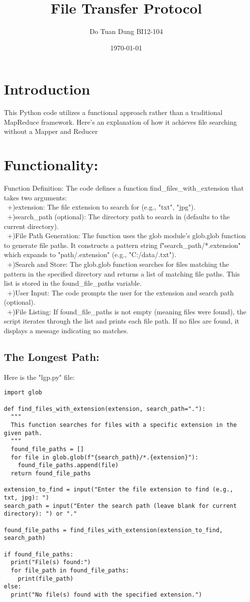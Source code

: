 \documentclass{article}
\title{File Transfer Protocol}
\author{Do Tuan Dung BI12-104}
\date{\today}
\begin{document}
\maketitle

\section{Introduction}
This Python code utilizes a functional approach rather than a traditional MapReduce framework. Here's an explanation of how it achieves file searching without a Mapper and Reducer

\section{Functionality:}
Function Definition: The code defines a function find_files_with_extension that takes two arguments:
\\\ +)extension: The file extension to search for (e.g., "txt", "jpg").
\\\ +)search_path (optional): The    directory path to search in (defaults to the current directory).
\\\ +)File Path Generation: The function uses the glob module's glob.glob function to generate file paths. It constructs a pattern string f"{search_path}/*.{extension}" which expands to "path/.extension" (e.g., "C:/data/.txt").
\\\ +)Search and Store: The glob.glob function searches for files matching the pattern in the specified directory and returns a list of matching file paths. This list is stored in the found_file_paths variable.
\\\ +)User Input: The code prompts the user for the extension and search path (optional).
\\\ +)File Listing:
If found_file_paths is not empty (meaning files were found), the script iterates through the list and prints each file path.
If no files are found, it displays a message indicating no matches.
\subsection{The Longest Path:}
 Here is the "lgp.py" file:
\begin{verbatim}
import glob

def find_files_with_extension(extension, search_path="."):
  """
  This function searches for files with a specific extension in the given path.
  """
  found_file_paths = []
  for file in glob.glob(f"{search_path}/*.{extension}"):
    found_file_paths.append(file)
  return found_file_paths

extension_to_find = input("Enter the file extension to find (e.g., txt, jpg): ")
search_path = input("Enter the search path (leave blank for current directory): ") or "."

found_file_paths = find_files_with_extension(extension_to_find, search_path)

if found_file_paths:
  print("File(s) found:")
  for file_path in found_file_paths:
    print(file_path)
else:
  print("No file(s) found with the specified extension.")



\end{verbatim}
\end{document}
